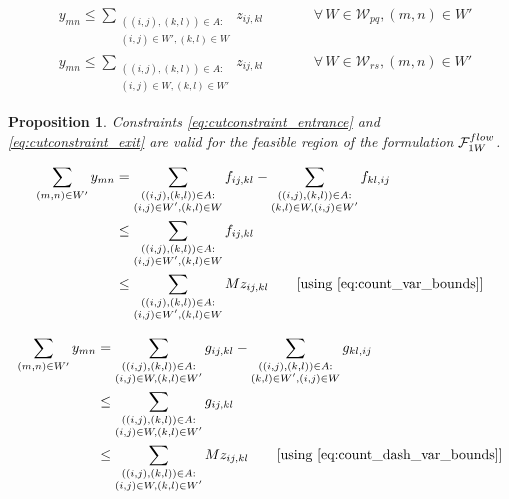 \documentclass[10pt,a4paper]{amsart}
\newtheorem{proposition}{Proposition}
\newcommand{\countvar}[4]{z_{#1#2,#3#4}}
\newcommand{\drivevar}[2]{y_{#1#2}}
\newcommand{\entrancex}{p}
\newcommand{\entrancey}{q}
\newcommand{\exitx}{r}
\newcommand{\exity}{s}
\newcommand{\gridarcset}{A}
\newcommand{\onewaypartition}{W}
\newcommand{\onewaypartitioncomp}{W'}
\newcommand{\onewaypartitionsets}[1]{\mathcal{W}_{#1}}
\begin{document}
\begin{align}
    & \drivevar{m}{n} \leq \sum_{\substack{((i,j),(k,l)) \in \gridarcset: \\ (i,j) \in \onewaypartitioncomp, (k, l) \in \onewaypartition}} \countvar{i}{j}{k}{l} \qquad && \forall \,  \onewaypartition \in \onewaypartitionsets{\entrancex \entrancey}, (m, n) \in \onewaypartitioncomp \label{eq:cutconstraint_entrance}\\
    & \drivevar{m}{n} \leq  \sum_{\substack{((i,j),(k,l)) \in \gridarcset: \\(i,j) \in \onewaypartition, (k, l) \in \onewaypartitioncomp}} \countvar{i}{j}{k}{l} \qquad && \forall \, \onewaypartition \in \onewaypartitionsets{\exitx \exity}, (m, n) \in \onewaypartitioncomp \label{eq:cutconstraint_exit}
\end{align}

\begin{proposition}
\label{prop:1w_aggregate}
Constraints \eqref{eq:cutconstraint_entrance} and \eqref{eq:cutconstraint_exit} are valid for the feasible region of the formulation $\mathcal{F}^{\textsc{flow}}_{\textsc{1W}}$.
\end{proposition}

\begin{align}
\sum_{(m,n) \in \onewaypartitioncomp} \drivevar{m}{n} & = \sum_{\substack{((i,j),(k,l)) \in \gridarcset: \\(i,j) \in \onewaypartitioncomp, (k, l) \in \onewaypartition}} f_{ij, kl} -
\sum_{\substack{((i,j),(k,l)) \in \gridarcset: \\(k, l) \in \onewaypartition, (i,j) \in \onewaypartitioncomp}} f_{kl, ij} \notag \\
& \leq \sum_{\substack{((i,j),(k,l)) \in \gridarcset: \\(i,j) \in \onewaypartitioncomp, (k, l) \in \onewaypartition}} f_{ij, kl} \notag \\
& \leq \sum_{\substack{((i,j),(k,l)) \in \gridarcset: \\(i,j) \in \onewaypartitioncomp, (k, l) \in \onewaypartition}} M \countvar{i}{j}{k}{l} \qquad \text{[using \eqref{eq:count_var_bounds}]} \label{eq:aggregate_vi_1w_a}
\end{align}

\begin{align}
\sum_{(m,n) \in \onewaypartitioncomp} \drivevar{m}{n} & = \sum_{\substack{((i,j),(k,l)) \in \gridarcset: \\(i, j) \in \onewaypartition, (k,l) \in \onewaypartitioncomp}} g_{ij, kl} - \sum_{\substack{((i,j),(k,l)) \in \gridarcset: \\(k,l) \in \onewaypartitioncomp, (i, j) \in \onewaypartition}} g_{kl, ij} \notag \\
& \leq \sum_{\substack{((i,j),(k,l)) \in \gridarcset: \\(i, j) \in \onewaypartition, (k,l) \in \onewaypartitioncomp}} g_{ij, kl}  \notag \\
& \leq \sum_{\substack{((i,j),(k,l)) \in \gridarcset: \\(i, j) \in \onewaypartition, (k,l) \in \onewaypartitioncomp}} M \countvar{i}{j}{k}{l} \qquad \text{[using \eqref{eq:count_dash_var_bounds}]} \label{eq:aggregate_vi_1w_b}
\end{align}
\end{document}
